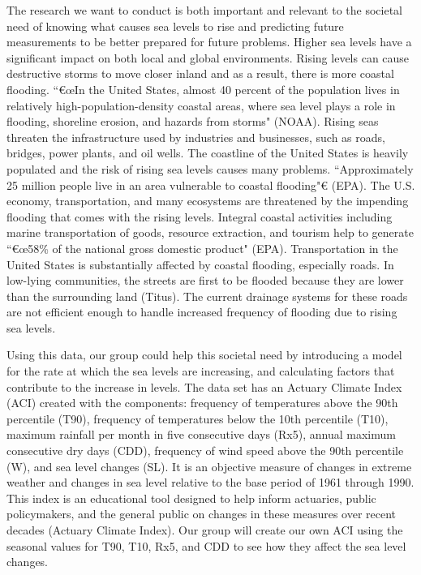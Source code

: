 \documentclass[12pt]{report}
\begin{document}
		\par The research we want to conduct is both important and relevant to the societal need of knowing what causes sea levels to rise and predicting future measurements to be better prepared for future problems. Higher sea levels have a significant impact on both local and global environments. Rising levels can cause destructive storms to move closer inland and as a result, there is more coastal flooding. \textquotedblleft€œIn the United States, almost 40 percent of the population lives in relatively high-population-density coastal areas, where sea level plays a role in flooding, shoreline erosion, and hazards from storms" (NOAA). Rising seas threaten the infrastructure used by industries and businesses, such as roads, bridges, power plants, and oil wells. The coastline of the United States is heavily populated and the risk of rising sea levels causes many problems. \textquotedblleft Approximately 25 million people live in an area vulnerable to coastal flooding"€ (EPA). The U.S. economy, transportation, and many ecosystems are threatened by the impending flooding that comes with the rising levels. Integral coastal activities including marine transportation of goods, resource extraction, and tourism help to generate \textquotedblleft€œ58\% of the national gross domestic product" (EPA). Transportation in the United States is substantially affected by coastal flooding, especially roads. In low-lying communities, the streets are first to be flooded because they are lower than the surrounding land (Titus). The current drainage systems for these roads are not efficient enough to handle increased frequency of flooding due to rising sea levels. 
		\par Using this data, our group could help this societal need by introducing a model for the rate at which the sea levels are increasing, and calculating factors that contribute to the increase in levels. The data set has an Actuary Climate Index (ACI) created with the components: frequency of temperatures above the 90th percentile (T90), frequency of temperatures below the 10th percentile (T10), maximum rainfall per month in five consecutive days (Rx5), annual maximum consecutive dry days (CDD), frequency of wind speed above the 90th percentile (W), and sea level changes (SL). It is an objective measure of changes in extreme weather and changes in sea level relative to the base period of 1961 through 1990. This index is an educational tool designed to help inform actuaries, public policymakers, and the general public on changes in these measures over recent decades (Actuary Climate Index). Our group will create our own ACI using the seasonal values for T90, T10, Rx5, and CDD to see how they affect the sea level changes. 
\end{document}
